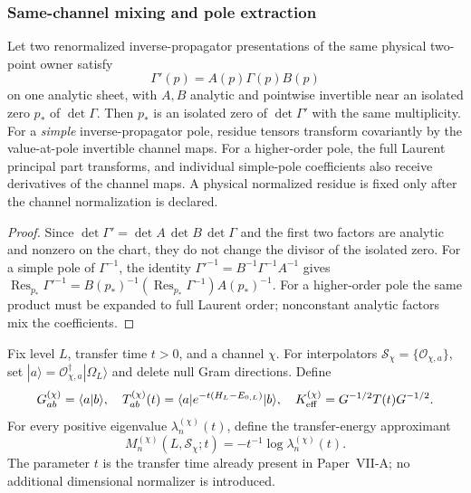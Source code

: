 \documentclass[12pt,a4paper]{article}
\begin{document}
\subsubsection{Same-channel mixing and pole extraction}
\label{p11:subsec:same-channel-mixing-pole-extraction}

\begin{lemma}
\label{p11:lem:v153-scheme-invariant-isolated-pole}
Let two renormalized inverse-propagator presentations of the same physical
two-point owner satisfy
\[
 \Gamma'(p)=A(p)\Gamma(p)B(p)
\]
on one analytic sheet, with \(A,B\) analytic and pointwise invertible near an
isolated zero \(p_*\) of \(\det\Gamma\).  Then \(p_*\) is an isolated zero
of \(\det\Gamma'\) with the same multiplicity.  For a \emph{simple} inverse-propagator pole, residue tensors transform
covariantly by the value-at-pole invertible channel maps. For a higher-order
pole, the full Laurent principal part transforms, and individual simple-pole
coefficients also receive derivatives of the channel maps. A physical
normalized residue is fixed only after the channel normalization is declared.
\end{lemma}

\begin{proof}
Since
\(\det\Gamma'=\det A\,\det B\,\det\Gamma\) and the first two factors
are analytic and nonzero on the chart, they do not change the divisor of the
isolated zero.  For a simple pole of \(\Gamma^{-1}\), the identity
\(\Gamma'^{-1}=B^{-1}\Gamma^{-1}A^{-1}\) gives
\(\operatorname{Res}_{p_*}\Gamma'^{-1}=B(p_*)^{-1}(\operatorname{Res}_{p_*}\Gamma^{-1})A(p_*)^{-1}\).
For a higher-order pole the same product must be expanded to full Laurent order; nonconstant analytic factors mix the coefficients.
\end{proof}

\begin{definition}
\label{p11:def:same-channel-finite-transfer-block}
Fix level \(L\), transfer time \(t>0\), and a channel \(\chi\).  For interpolators \(\mathcal S_\chi=\{\mathcal O_{\chi,a}\}\), set \(|a\rangle=\mathcal O_{\chi,a}^\dagger|\Omega_L\rangle\) and delete null Gram directions.  Define
\begin{equation}
\label{p11:eq:same-channel-gram-transfer}
G^{(\chi)}_{ab}=\langle a|b\rangle,
\quad T^{(\chi)}_{ab}(t)=\langle a|e^{-t(H_L-E_{0,L})}|b\rangle,
\quad K_{\rm eff}^{(\chi)}=G^{-1/2}T(t)G^{-1/2}.
\end{equation}
For every positive eigenvalue \(\lambda_n^{(\chi)}(t)\), define the transfer-energy approximant
\begin{equation}
\label{p11:eq:same-channel-pole-masses}
M_n^{(\chi)}(L,\mathcal S_\chi;t)=-t^{-1}\log\lambda_n^{(\chi)}(t).
\end{equation}
The parameter \(t\) is the transfer time already present in Paper~VII-A; no additional dimensional normalizer is introduced.
\end{definition}
\end{document}
